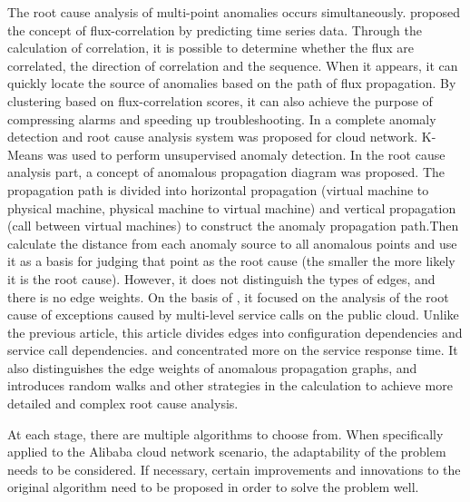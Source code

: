 \begin{survey}
The root cause analysis of multi-point anomalies occurs simultaneously. \cite{DBLP:conf/iwqos/SuZXLBZCLNZWP19} proposed the concept of flux-correlation by predicting time series data. Through the calculation of correlation, it is possible to determine whether the flux are correlated, the direction of correlation and the sequence. When it appears, it can quickly locate the source of anomalies based on the path of flux propagation. By clustering based on flux-correlation scores, it can also achieve the purpose of compressing alarms and speeding up troubleshooting. In \cite{lin2016automated} a complete anomaly detection and root cause analysis system was proposed for cloud network. K-Means was used to perform unsupervised anomaly detection. In the root cause analysis part, a concept of anomalous propagation diagram was proposed. The propagation path is divided into horizontal propagation (virtual machine to physical machine, physical machine to virtual machine) and vertical propagation (call between virtual machines) to construct the anomaly propagation path.Then calculate the distance from each anomaly source to all anomalous points and use it as a basis for judging that point as the root cause (the smaller the more likely it is the root cause). However, it does not distinguish the types of edges, and there is no edge weights. \cite{weng2018root} On the basis of \cite{lin2016automated}, it focused on the analysis of the root cause of exceptions caused by multi-level service calls on the public cloud. Unlike the previous article, this article divides edges into configuration dependencies and service call dependencies. and concentrated more on the service response time. It also distinguishes the edge weights of anomalous propagation graphs, and introduces random walks and other strategies in the calculation to achieve more detailed and complex root cause analysis.

At each stage, there are multiple algorithms to choose from. When specifically applied to the Alibaba cloud network scenario, the adaptability of the problem needs to be considered. If necessary, certain improvements and innovations to the original algorithm need to be proposed in order to solve the problem well.




\end{survey}
